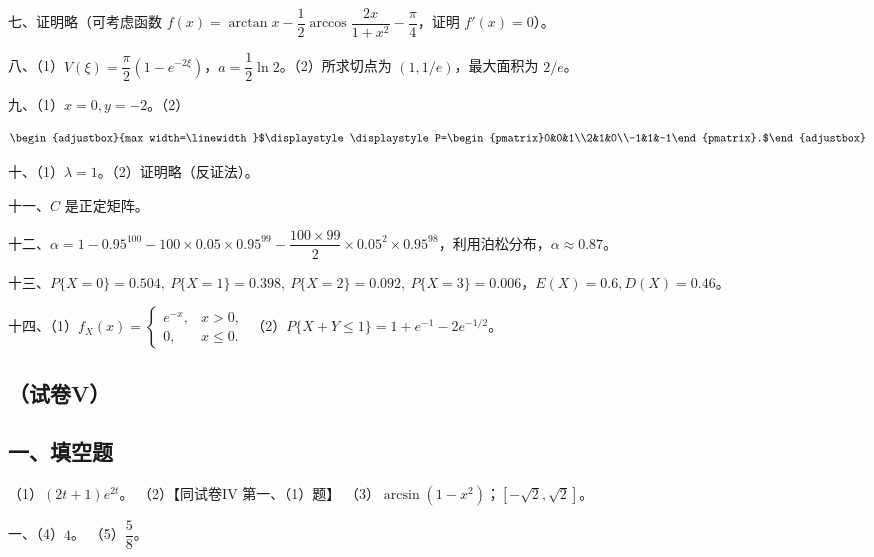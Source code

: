 \documentclass[UTF8,12pt]{ctexart}
\newcommand{\fitmath}[1]{\begin{adjustbox}{max width=\linewidth}$\displaystyle #1$\end{adjustbox}}
\begin{document}
七、证明略（可考虑函数 \(\displaystyle f(x)=\arctan x-\dfrac{\displaystyle 1}{\displaystyle 2}\arccos\dfrac{\displaystyle 2x}{\displaystyle 1+x^2}-\dfrac{\displaystyle \pi}{\displaystyle 4}\)，证明 \(\displaystyle f\prime(x)=0\)）。


八、（1）\(\displaystyle V(\xi)=\dfrac{\displaystyle \pi}{\displaystyle 2}(1-e^{-2\xi})\)，\(\displaystyle a=\dfrac{\displaystyle 1}{\displaystyle 2}\ln2\)。（2）所求切点为 \(\displaystyle (1,\allowbreak 1/e)\)，最大面积为 \(\displaystyle 2/e\)。


九、（1）\(\displaystyle x=0,\allowbreak y=-2\)。（2）


\[\fitmath{\displaystyle P=\begin{pmatrix}0&0&1\\2&1&0\\-1&1&-1\end{pmatrix}.}\]


十、（1）\(\displaystyle \lambda=1\)。（2）证明略（反证法）。


十一、\(\displaystyle C\) 是正定矩阵。


十二、\(\displaystyle \alpha=1-0.95^{100}-100\times0.05\times0.95^{99}-\dfrac{\displaystyle 100\times99}{\displaystyle 2}\times0.05^2\times0.95^{98}\)，利用泊松分布，\(\displaystyle \alpha\approx0.87\)。


十三、\(\displaystyle P\{X=0\}=0.504,\allowbreak \ P\{X=1\}=0.398,\allowbreak \ P\{X=2\}=0.092,\allowbreak \ P\{X=3\}=0.006\)，\(\displaystyle E(X)=0.6,\allowbreak D(X)=0.46\)。


十四、（1）\(\displaystyle f_X(x)=\begin{cases}e^{-x},\allowbreak &x>0,\allowbreak \\0,\allowbreak &x\le0.\end{cases}\) （2）\(\displaystyle P\{X+Y\le1\}=1+e^{-1}-2e^{-1/2}\)。


\subsection*{（试卷V）}

\subsection*{一、填空题}

（1）\(\displaystyle (2t+1)e^{2t}\)。 （2）【同试卷IV 第一、（1）题】 （3）\(\displaystyle \arcsin(1-x^2)\)；\(\displaystyle [-\sqrt2,\allowbreak \sqrt2]\)。


一、（4）\(\displaystyle 4\)。 （5）\(\displaystyle \dfrac{\displaystyle 5}{\displaystyle 8}\)。
\end{document}
